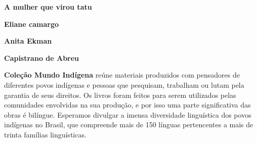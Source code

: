 \textbf{A mulher que virou tatu} \lipsum[1]

\textbf{Eliane camargo} \lipsum[2]

\textbf{Anita Ekman} \lipsum[2]

\textbf{Capistrano de Abreu} \lipsum[2]

\textbf{Coleção Mundo Indígena} reúne materiais produzidos com pensadores de diferentes povos indígenas e pessoas que pesquisam, trabalham ou lutam pela garantia de seus direitos. Os livros foram feitos para serem utilizados pelas comunidades envolvidas na sua produção, e por isso uma parte significativa das obras é bilíngue. Esperamos divulgar a imensa diversidade linguística dos povos indígenas no Brasil, que compreende mais de 150 línguas pertencentes a mais de trinta famílias linguísticas.



